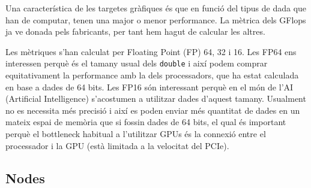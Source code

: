 Una característica de les targetes gràfiques és que en funció del tipus de dada que han de computar, tenen una major o menor performance. La mètrica dels GFlops ja ve donada pels fabricants, per tant hem hagut de calcular les altres. 

Les mètriques s'han calculat per Floating Point (FP) 64, 32 i 16.
Les FP64 ens interessen perquè és el tamany usual dels \texttt{double} i així podem comprar equitativament la performance amb la dels processadors, que ha estat calculada en base a dades de 64 bits.
Les FP16 són interessant perquè en el món de l'AI (Artificial Intelligence) s'acostumen a utilitzar dades d'aquest tamany. Usualment no es necessita més precisió i així es poden enviar més quantitat de dades en un mateix espai de memòria que si fossin dades de 64 bits, el qual és important perquè el bottleneck habitual a l'utilitzar GPUs és la connexió entre el processador i la GPU (està limitada a la velocitat del PCIe).

\subsection{Nodes}


